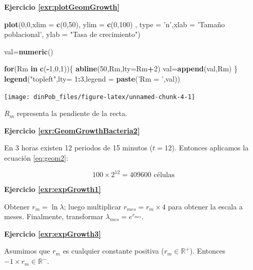 \documentclass[12pt,letterpaper,]{book}
\newenvironment{Shaded}{\begin{snugshade}}{\end{snugshade}}
\newcommand{\KeywordTok}[1]{\textcolor[rgb]{0.13,0.29,0.53}{\textbf{#1}}}
\newcommand{\DataTypeTok}[1]{\textcolor[rgb]{0.13,0.29,0.53}{#1}}
\newcommand{\DecValTok}[1]{\textcolor[rgb]{0.00,0.00,0.81}{#1}}
\newcommand{\StringTok}[1]{\textcolor[rgb]{0.31,0.60,0.02}{#1}}
\newcommand{\ControlFlowTok}[1]{\textcolor[rgb]{0.13,0.29,0.53}{\textbf{#1}}}
\newcommand{\OperatorTok}[1]{\textcolor[rgb]{0.81,0.36,0.00}{\textbf{#1}}}
\newcommand{\NormalTok}[1]{#1}
\begin{document}
\textbf{Ejercicio \ref{exr:plotGeomGrowth}}

\begin{Shaded}
\begin{Highlighting}[]
\KeywordTok{plot}\NormalTok{(}\DecValTok{0}\NormalTok{,}\DecValTok{0}\NormalTok{,}\DataTypeTok{xlim =} \KeywordTok{c}\NormalTok{(}\DecValTok{0}\NormalTok{,}\DecValTok{50}\NormalTok{),}
     \DataTypeTok{ylim =} \KeywordTok{c}\NormalTok{(}\DecValTok{0}\NormalTok{,}\DecValTok{100}\NormalTok{) ,}
     \DataTypeTok{type =} \StringTok{'n'}\NormalTok{,}\DataTypeTok{xlab =} \StringTok{'Tamaño poblacional'}\NormalTok{,}
     \DataTypeTok{ylab =} \StringTok{"Tasa de crecimiento"}\NormalTok{)}

\NormalTok{val=}\KeywordTok{numeric}\NormalTok{()}

\ControlFlowTok{for}\NormalTok{(Rm }\ControlFlowTok{in} \KeywordTok{c}\NormalTok{(}\OperatorTok{-}\DecValTok{1}\NormalTok{,}\DecValTok{0}\NormalTok{,}\DecValTok{1}\NormalTok{))\{}
  \KeywordTok{abline}\NormalTok{(}\DecValTok{50}\NormalTok{,Rm,}\DataTypeTok{lty=}\NormalTok{Rm}\OperatorTok{+}\DecValTok{2}\NormalTok{)}
\NormalTok{  val=}\KeywordTok{append}\NormalTok{(val,Rm)}
\NormalTok{\}}
\KeywordTok{legend}\NormalTok{(}\StringTok{"topleft"}\NormalTok{,}\DataTypeTok{lty=} \DecValTok{1}\OperatorTok{:}\DecValTok{3}\NormalTok{,}\DataTypeTok{legend =} \KeywordTok{paste}\NormalTok{(}\StringTok{'Rm = '}\NormalTok{,val))}
\end{Highlighting}
\end{Shaded}

\begin{center}\texttt{[image: dinPob\_files/figure-latex/unnamed-chunk-4-1]} \end{center}

\(R_m\) representa la pendiente de la recta.

\textbf{Ejercicio \ref{exr:GeomGrowthBacteria2}}

En 3 horas existen 12 periodos de 15 minutos (\(t=12\)). Entonces
aplicamos la ecuación \eqref{eq:geom2}:

\[
100\times 2^{12} = \num{409600}\text{ células}
\]

\textbf{Ejercicio \ref{exr:expGrowth1}}

Obtener \(r_m = \ln \lambda\); luego multiplicar
\(r_{mes}=r_m \times 4\) para obtener la escala a meses. Finalmente,
transformar \(\lambda_{mes}=e^{r_{mes}}\).

\textbf{Ejercicio \ref{exr:expGrowth3}}

Asumimos que \(r_m\) es cualquier constante positiva
(\(r_m \in \mathbb{R}^+\)). Entonces \(-1\times r_m \in \mathbb{R}^-\).
\end{document}
